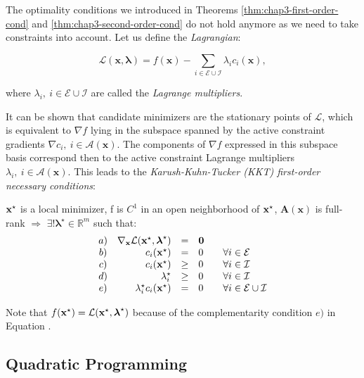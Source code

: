 The optimality conditions we introduced in Theorems
\ref{thm:chap3-first-order-cond} and \ref{thm:chap3-second-order-cond}
do not hold anymore as we need to take constraints into account. Let
us define the \emph{Lagrangian}:

\begin{equation}
\mathcal{L}(\mathbf{x},\boldsymbol{\lambda}) =
f(\mathbf{x})-\sum_{i\in\mathcal{E}\cup\mathcal{I}}
\lambda_ic_i(\mathbf{x}),
\end{equation}

where $\lambda_i,~i\in \mathcal{E}\cup\mathcal{I}$ are called the
\emph{Lagrange multipliers}.

It can be shown that candidate minimizers are the stationary points of
$\mathcal{L}$, which is equivalent to $\nabla f$ lying in the subspace
spanned by the active constraint gradients $\nabla
c_i,~i\in\mathcal{A(\mathbf{x})}$. The components of $\nabla f$
expressed in this subspace basis correspond then to the active
constraint Lagrange multipliers
$\lambda_i,~i\in\mathcal{A}(\mathbf{x})$. This leads to the
\emph{Karush-Kuhn-Tucker (KKT) first-order necessary conditions}:

\begin{theorem}
\label{eq:chap3-kkt}
$\mathbf{x}^{\star}$ is a local minimizer, f is $C^1$ in an open neighborhood
of $\mathbf{x}^{\star}$, $\mathbf{A}(\mathbf{x})$ is full-rank $\Rightarrow$
$\exists! \boldsymbol{\lambda}^{\star} \in \mathbb R^m$ such that:
\[
\begin{array}{crcl}
a) & \nabla_{\mathbf{x}}\mathcal{L}(\argmin{x}, \boldsymbol{\lambda}^\star) & = & \mathbf{0} \\%
b) & c_i(\argmin{x}) & = & 0 \qquad \forall i \in \mathcal{E} \\%
c) & c_i(\argmin{x}) & \ge & 0 \qquad \forall i \in \mathcal{I}\\%
d) & \lambda_i^{\star} & \ge & 0 \qquad \forall i \in \mathcal{I}\\%
e) & \lambda_i^{\star} c_i(\argmin{x}) & = & 0 \qquad \forall i \in \mathcal{E}\cup\mathcal{I}%
\end{array}
\]
\end{theorem}

Note that $f(\mathbf{x}^{\star}) = \mathcal{L}(\mathbf{x}^{\star},
\boldsymbol{\lambda}^\star)$ because of the complementarity condition
$e)$ in Equation .

\subsection{Quadratic Programming}

